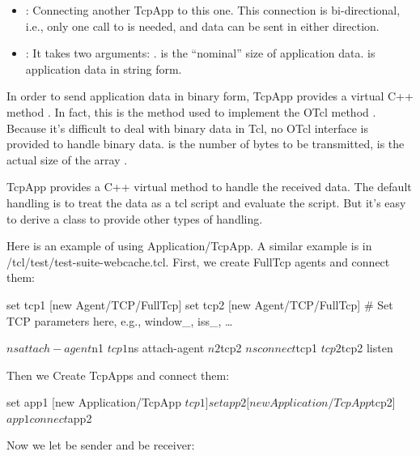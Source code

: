 \begin{itemize}
\item {}: Connecting another TcpApp to this one. This
  connection is bi-directional, i.e., only one call to  is 
  needed, and data can be sent in either direction. 
\item {}: It takes two arguments: .
   is the ``nominal'' size of application data.  
  is application data in string form.
\end{itemize}

In order to send application data in binary form, TcpApp provides a 
virtual C++ method .
In fact, this is the method used to implement the OTcl method .
Because it's difficult to deal with binary data in Tcl, no OTcl interface
is provided to handle binary data.  is the number of bytes 
to be transmitted,  is the actual size of the array .

TcpApp provides a C++ virtual method 
to handle the received data. The default handling is to treat the data 
as a tcl script and evaluate the script. But it's easy to derive a class
to provide other types of handling.

Here is an example of using Application/TcpApp. A similar example is 
 in \ns/tcl/test/test-suite-webcache.tcl.
First, we create FullTcp agents and connect them:

\begin{program}
        set tcp1 [new Agent/TCP/FullTcp]
        set tcp2 [new Agent/TCP/FullTcp]
        # {\cf Set TCP parameters here, e.g., window_, iss_, \ldots}

        $ns attach-agent $n1 $tcp1
        $ns attach-agent $n2 $tcp2
        $ns connect $tcp1 $tcp2
        $tcp2 listen
\end{program}

Then we Create TcpApps and connect them:

\begin{program}
        set app1 [new Application/TcpApp $tcp1]
        set app2 [new Application/TcpApp $tcp2]
        $app1 connect $app2
\end{program}

Now we let  %
be sender and  %
be receiver:


